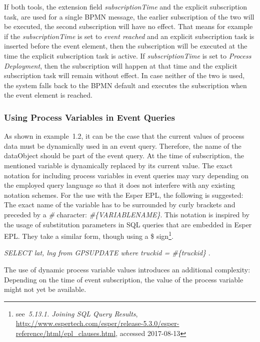 If both tools, the extension field \textit{subscriptionTime} and the explicit subscription task, are used for a single BPMN message, the earlier subscription of the two will be executed, the second subscription will have no effect.
That means for example if the \textit{subscriptionTime} is set to \textit{event reached} and an explicit subscription task is inserted before the event element, then the subscription will be executed at the time the explicit subscription task is active.
If \textit{subscriptionTime} is set to \textit{Process Deployment}, then the subscription will happen at that time and the explicit subscription task will remain without effect.
In case neither of the two is used, the system falls back to the BPMN default and executes the subscription when the event element is reached.

\subsubsection{Using Process Variables in Event Queries}\label{ch:bpmnx:variables-in-queries}


As shown in example~1.2, it can be the case that the current values of process data must be dynamically used in an event query. 
Therefore, the name of the dataObject should be part of the event query. At the time of subscription, the mentioned variable is dynamically replaced by its current value.
The exact notation for including process variables in event queries may vary depending on the employed query language so that it does not interfere with any existing notation schemes.
For the use with the Esper EPL, the following is suggested: The exact name of the variable has to be surrounded by curly brackets and preceded by a \textit{\#} character: \textit{\#\{VARIABLENAME\}}.
This notation is inspired by the usage of substitution parameters in SQL queries that are embedded in Esper EPL. They take a similar form, though using a \$ sign\footnote{see~\textit{5.13.1. Joining SQL Query Results}, \url{http://www.espertech.com/esper/release-5.3.0/esper-reference/html/epl_clauses.html}, accessed 2017-08-13}.

\textit{SELECT lat, lng from GPSUPDATE where truckid = \#\{truckid\} }.

The use of dynamic process variable values introduces an additional complexity: Depending on the time of event subscription, the value of the process variable might not yet be available.


